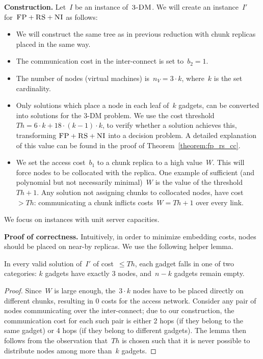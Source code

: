\documentclass[preprint,12pt]{elsarticle}
\newcommand{\maciek}[1]{\textcolor{brown}{maciek: #1}}
\newcommand{\CC}{\textsc{NI}}
\newcommand{\FP}{\textsc{FP}}
\newcommand{\RS}{\textsc{RS}}
\newcommand{\CostTrans}{\ensuremath{b_1}}
\newcommand{\CostCom}{\ensuremath{b_2}}
\newcommand{\Vms}{\ensuremath{n_V}}
\newcommand{\TDM}{\textsc{3-DM}}
\newcommand{\Thr}{\ensuremath{Th}}
\begin{document}
\textbf{Construction.}
Let~$I$ be an instance of~$\TDM$. We will create an instance~$I'$
for~$\FP+\RS+\CC$ as follows:
\begin{itemize}
\item We will construct the same tree as in previous reduction with
chunk replicas placed in the same way.
\item The communication cost in the inter-connect is set to~$\CostCom = 1$.
\item The number of nodes (virtual machines) is~$\Vms = 3 \cdot k$, where~$k$ is the set cardinality.
\item Only solutions which place a node in each leaf of~$k$ gadgets, can
be converted into solutions for the 3-DM problem. We use the cost threshold
$\Thr =  6 \cdot k + 18 \cdot
(k - 1) \cdot k$, to verify whether a solution achieves this, transforming
$\FP+\RS+\CC$ into a decision problem. A detailed explanation of this value can
be found in the proof of Theorem~\ref{theorem:fp_rs_cc}.
\item We set the access cost~$\CostTrans$ to a chunk replica to a high value~$W$. This will force
nodes to be collocated with the replica. One example of sufficient
(and polynomial but not necessarily minimal)~$W$
is the value of the threshold~$\Thr+1$. Any solution not
assigning chunks to collocated nodes, have cost~$> \Thr$:
communicating a chunk inflicts costs~$W=\Thr+1$ over every link.
\end{itemize}

We focus on instances with unit server capacities.

\textbf{Proof of correctness.}
Intuitively, in order to minimize embedding costs,
nodes should be placed on near-by replicas. We use the following
helper lemma.
\begin{lemma}\label{lemma:helper}
In every valid solution of~$I'$ of cost~$\leq \Thr$, each gadget
falls in one of two categories:
$k$ gadgets have exactly
$3$ nodes, and~$n-k$ gadgets remain empty.
\end{lemma}
\begin{proof}
Since~$W$ is large enough, the~$3\cdot k$ nodes have to be placed
directly on different chunks, resulting in 0 costs for the access network.
Consider any pair of nodes
communicating over the
inter-connect; due to our construction, the communication cost
for each such pair is either
2 hops (if they belong to the same gadget) or 4 hops (if they belong
to different gadgets).
The lemma then follows from the observation that~$\Thr$
is chosen such that it is never possible to distribute nodes
among more than~$k$ gadgets.
\end{proof}
\end{document}

